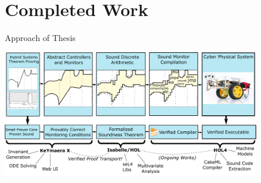 \documentclass[wide]{beamer}
\theoremstyle{plain}
\theoremstyle{definition}
\theoremstyle{remark}
\begin{document}
\section{Completed Work}

\begin{frame}[t]{Approach of Thesis}
\begin{center}
  \includegraphics[width=4.4in]{img/veriphy-overview.png}
\end{center}
\end{frame}
\end{document}
